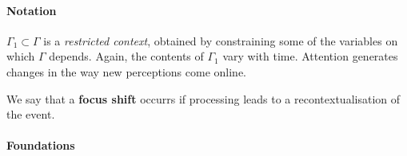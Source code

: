 \paragraph{\textbf{\upshape Notation}}

$\Gamma_1 \subset \Gamma$ is a \emph{restricted context}, obtained by
constraining some of the variables on which $\Gamma$ depends.  Again,
the contents of $\Gamma_1$ vary with time.  Attention generates
changes in the way new perceptions come online.

\begin{defn}\label{def:interest}
\hypertarget{def:interest}{} We say that a \textbf{focus shift}
occurrs if processing leads to a recontextualisation of the event.
\end{defn}

\paragraph{\textbf{\upshape Foundations}}
                                         
